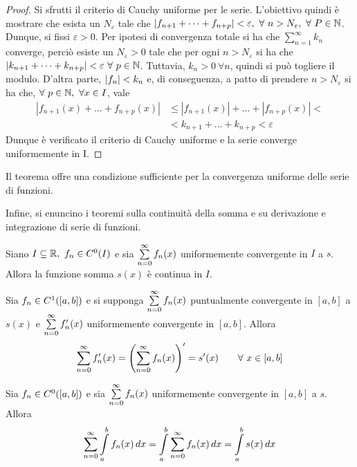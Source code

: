 \begin{proof}
    Si sfrutti il criterio di Cauchy uniforme per le serie. L'obiettivo quindi è mostrare che esista un $N_\varepsilon$ tale che $|f_{n+1}+ \dots+ f_{n+p}|< \varepsilon,\ \forall\ n > N_\varepsilon,\ \forall\ P\in \mathbb{N}$.
    Dunque, si fissi $\varepsilon>0$. Per ipotesi di convergenza totale si ha che $\sum\limits_{n=1}^{\infty}{k_n}$ converge, perciò esiste un $N_\varepsilon>0$ tale che per ogni $n>N_\varepsilon$ si ha che $|k_{n+1}+\dots+k_{n+p}|< \varepsilon\ \forall\ p \in \mathbb{N}$. 
    Tuttavia, $k_n>0\ \forall n$, quindi si può togliere il modulo. D'altra parte, $|f_n|<k_n$ e, di conseguenza, a patto di prendere $n> N_\varepsilon$ si ha che, $\forall\ p \in \mathbb{N},\ \forall x \in I$, vale
    \begin{equation}
    \begin{aligned}
        |f_{n+1}(x)+ \dots + f_{n+p}(x)| &\leq |f_{n+1}(x)|+ \dots + |f_{n+p}(x)|<\\ 
        &< k_{n+1}+ \dots + k_{n+p} < \varepsilon
    \end{aligned}
    \end{equation}
    Dunque è verificato il criterio di Cauchy uniforme e la serie converge uniformemente in I.
\end{proof}
\begin{oss}
    Il teorema offre una condizione sufficiente per la convergenza uniforme delle serie di funzioni.
\end{oss}
Infine, si enuncino i teoremi sulla continuità della somma e su derivazione e integrazione di serie di funzioni.
\begin{theorem}
    Siano $I \subseteq \mathbb{R},\ f_n \in C^0(I)$ e sia $\sum\limits_{n=0}^{\infty}{f_n(x)}$ uniformemente convergente in $I$ a $s$. Allora la funzione somma $s(x)$ è continua in $I$.
\end{theorem}
\begin{theorem}
    Sia $f_n \in C^1([a,b])$ e si supponga $\sum\limits_{n=0}^{\infty}{f_n(x)}$ puntualmente convergente in $[a,b]$ a $s(x)$ e $\sum\limits_{n=0}^{\infty}{f_n'(x)}$ uniformemente convergente in $[a,b]$. Allora
    \begin{equation}
        \sum\limits_{n=0}^{\infty}{f_n'(x)}= 
        \left(\sum\limits_{n=0}^{\infty}{f_n(x)}\right)'= s'(x) \qquad \forall\ x \in [a,b]
    \end{equation}
\end{theorem}
\begin{theorem}
    Sia $f_n \in C^0([a,b])$ e sia $\sum\limits_{n=0}^{\infty}{f_n(x)}$ uniformemente convergente in $[a,b]$ a $s$. Allora
    \begin{equation}
        \sum\limits_{n=0}^{\infty}{\int\limits_{a}^{b}{f_n(x)}\, dx}= \int\limits_{a}^{b}{\sum\limits_{n=0}^{\infty}{f_n(x)}\, dx}= \int\limits_{a}^{b}{s(x)}\, dx
    \end{equation}
\end{theorem}
